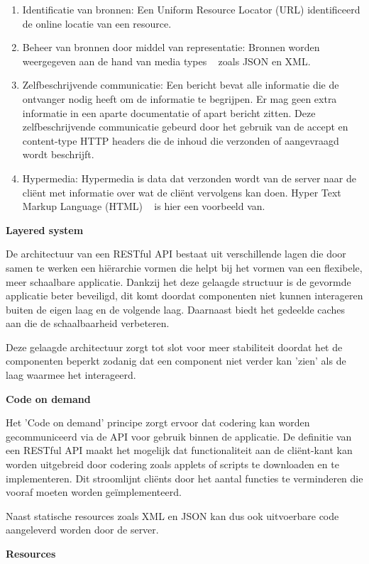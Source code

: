 \begin{enumerate}
\item Identificatie van bronnen: Een Uniform Resource Locator (URL) identificeerd de online locatie van een resource.
\item Beheer van bronnen door middel van representatie: Bronnen worden weergegeven aan de hand van media types ~\autocite{N.Freed1996} zoals JSON en XML.
\item Zelfbeschrijvende communicatie: Een bericht bevat alle informatie die de ontvanger nodig heeft om de informatie te begrijpen. Er mag geen extra informatie in een aparte documentatie of apart bericht zitten. Deze zelfbeschrijvende communicatie gebeurd door het gebruik van de accept en content-type HTTP headers die de inhoud die verzonden of aangevraagd wordt beschrijft.
\item Hypermedia: Hypermedia is data dat verzonden wordt van de server naar de cliënt met informatie over wat de cliënt vervolgens kan doen. Hyper Text Markup Language (HTML) ~\autocite{W3schools} is hier een voorbeeld van.
\end{enumerate}
\textbf{Layered system}

De architectuur van een RESTful API bestaat uit verschillende lagen die door samen te werken een hiërarchie vormen die helpt bij het vormen van een flexibele, meer schaalbare applicatie. Dankzij het deze gelaagde structuur is de gevormde applicatie beter beveiligd, dit komt doordat componenten niet kunnen interageren buiten de eigen laag en de volgende laag. Daarnaast biedt het gedeelde caches aan die de schaalbaarheid verbeteren.

Deze gelaagde architectuur zorgt tot slot voor meer stabiliteit doordat het de componenten beperkt zodanig dat een component niet verder kan 'zien' als de laag waarmee het interageerd.

\textbf{Code on demand}

Het 'Code on demand' principe zorgt ervoor dat codering kan worden gecommuniceerd via de API voor gebruik binnen de applicatie. De definitie van een RESTful API maakt het mogelijk dat functionaliteit aan de cliënt-kant kan worden uitgebreid door codering zoals applets of scripts te downloaden en te implementeren. Dit stroomlijnt cliënts door het aantal functies te verminderen die vooraf moeten worden geïmplementeerd.

Naast statische resources zoals XML en JSON kan dus ook uitvoerbare code aangeleverd worden door de server.

\textbf{Resources}

